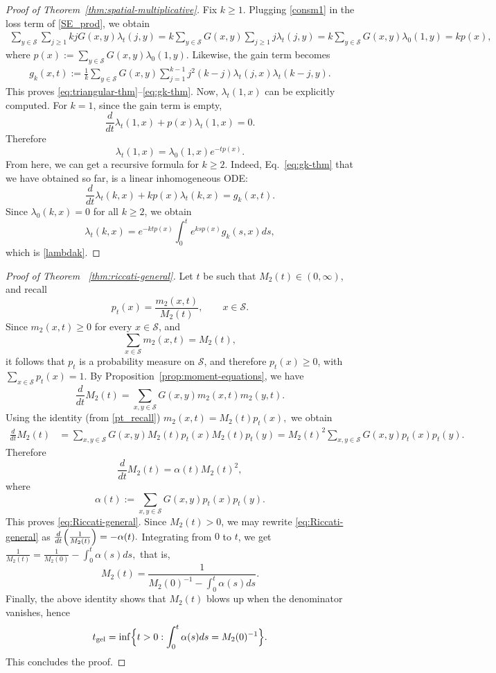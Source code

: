 \documentclass[12pt,twoside]{article}
\begin{document}
\begin{proof}[Proof of Theorem~\ref{thm:spatial-multiplicative}]
Fix $k\ge1$. Plugging
\eqref{consm1} in the loss term of
\eqref{SE_prod}, we obtain
\begin{align*}
\sum_{y\in\mathcal S}\sum_{j\ge1}
kjG(x,y)\lambda_t(j,y)
=
k\sum_{y\in\mathcal S}G(x,y)\sum_{j\ge1}j\lambda_t(j,y)
=
k\sum_{y\in\mathcal S}G(x,y)\lambda_0(1,y)
=
kp(x),
\end{align*}
where $p(x):=\sum_{y\in\mathcal S}G(x,y)\lambda_0(1,y)$. Likewise, the gain term becomes
\begin{align*}
g_{k}(x,t):=\frac1k\sum_{y\in\mathcal S}G(x,y)\sum_{j=1}^{k-1}
j^2(k-j)\lambda_t(j,x)\lambda_t(k-j,y).
\end{align*}
This proves \eqref{eq:triangular-thm}--\eqref{eq:gk-thm}.
Now, $\lambda_t(1,x)$ can be explicitly computed.
For $k=1$, since the gain term is empty,
$$
\frac{d}{dt}\lambda_t(1,x)+p(x)\lambda_t(1,x)=0.
$$
Therefore
$$
\lambda_t(1,x)=\lambda_0(1,x)e^{-tp(x)}.
$$
From here, we can get a recursive formula for $k\ge2$.
Indeed, Eq.~\eqref{eq:gk-thm} that we have obtained so far, is a linear inhomogeneous ODE:
$$
\frac{d}{dt} \lambda_t(k,x)+kp(x)\lambda_t(k,x)=g_k(x,t).
$$
Since $\lambda_0(k,x)=0$ for all $k\ge2$, we obtain
$$
\lambda_t(k,x)
=
e^{-k t p(x)}
\int_0^t e^{k s p(x)}g_k(s,x)ds,
$$
which is \eqref{lambdak}.
\end{proof}




\begin{proof}[Proof of Theorem ~\ref{thm:riccati-general}]
Let $t$ be such that $M_2(t)\in(0,\infty)$, and recall
\begin{equation}\label{pt_recall}
p_t(x)=\frac{m_2(x,t)}{M_2(t)},
\qquad x\in\mathcal S.
\end{equation}
Since $m_2(x,t)\ge 0$ for every $x\in\mathcal S$, and
$$
\sum_{x\in\mathcal S} m_2(x,t)=M_2(t),
$$
it follows that $p_t$ is a probability measure on $\mathcal S$, and therefore
$
p_t(x)\ge 0$,
with 
$\sum_{x\in\mathcal S} p_t(x)=1.
$
By Proposition~\ref{prop:moment-equations}, we have
$$
\frac{d}{dt}M_2(t)
=
\sum_{x,y\in\mathcal S} G(x,y)m_2(x,t)m_2(y,t).
$$
Using the identity (from \eqref{pt_recall})
$
m_2(x,t)=M_2(t)p_t(x),
$
we obtain
\begin{align*}
\frac{d}{dt}M_2(t)
&=
\sum_{x,y\in\mathcal S} G(x,y)M_2(t)p_t(x)M_2(t)p_t(y)=
M_2(t)^2\sum_{x,y\in\mathcal S} G(x,y)p_t(x)p_t(y).
\end{align*}
Therefore
$$
\frac{d}{dt}M_2(t)=\alpha(t)M_2(t)^2,
$$
where
$$
\alpha(t):=\sum_{x,y\in\mathcal S} G(x,y)p_t(x)p_t(y).
$$
This proves \eqref{eq:Riccati-general}.
Since $M_2(t)>0$, we may rewrite \eqref{eq:Riccati-general} as
$
\frac{d}{dt}\Bigl(\frac{1}{M_2(t)}\Bigr)
=
-\alpha(t).
$
Integrating from $0$ to $t$, we get
$
\frac{1}{M_2(t)}=\frac{1}{M_2(0)}-\int_0^t \alpha(s)ds,
$
that is,
$$
M_2(t)
=
\frac{1}{M_2(0)^{-1}-\int_0^t\alpha(s)ds}.
$$
Finally, the above identity shows that $M_2(t)$ blows up when the denominator vanishes, hence
$$
t_{\mathrm{gel}}
=
\inf\Bigl\{
t>0:\int_0^t\alpha(s)ds=M_2(0)^{-1}
\Bigr\}.
$$
This concludes the proof.
\end{proof}
\end{document}
